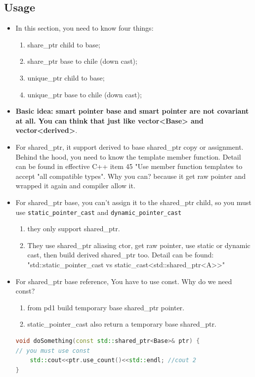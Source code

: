 \documentclass[a4paper,11pt,twoside]{book}
\begin{document}
\subsection{Usage}
\begin{itemize}
\item In this section, you need to know four things:
\begin{enumerate}
\item share\_ptr child to base;
\item share\_ptr base to chile (down cast);
\item unique\_ptr child to base;
\item unique\_ptr base to chile (down cast);
\end{enumerate}

		\item \textbf{Basic idea: smart pointer base and smart pointer are not covariant at all. You can think that just like vector<Base> and vector<derived>}.

		\item For shared\_ptr, it support derived to base shared\_ptr copy or assignment. Behind the hood, you need to know the template member function. Detail can be found in effective C++ item 45 "Use member function templates to accept "all compatible types". Why you can? because it get raw pointer and wrapped it again and compiler allow it.

		\item  For shared\_ptr base, you can't assign it to the shared\_ptr child, so you must use \texttt{static\_pointer\_cast} and \texttt{dynamic\_pointer\_cast}
		\begin{enumerate}
			\item they only support shared\_ptr.
			\item They use shared\_ptr aliasing ctor, get raw pointer, use static or dynamic cast, then build derived shared\_ptr too. Detail can be found: \\
			"std::static\_pointer\_cast vs static\_cast<std::shared\_ptr<A>>"
		\end{enumerate}

		\item For shared\_ptr base reference, You have to use const. Why do we need const?
		\begin{enumerate}
			\item from pd1 build temporary base shared\_ptr pointer.
			\item static\_pointer\_cast also return a temporary base shared\_ptr.
		\end{enumerate}
\begin{lstlisting}[frame=single, language=c++, mathescape=true]
void doSomething(const std::shared_ptr<Base>& ptr) {
// you must use const
    std::cout<<ptr.use_count()<<std::endl; //cout 2
}


\end{lstlisting}
\end{itemize}
\end{document}
